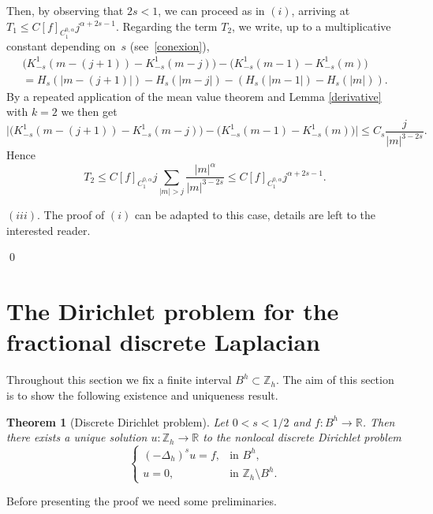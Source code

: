 \documentclass[a4paper,11pt,reqno]{amsart}
\newcommand{\R}{\mathbb{R}}
\newcommand{\Z}{\mathbb{Z}}
\newtheorem{thm}{Theorem}[section]
\theoremstyle{definition}
\numberwithin{equation}{section}
\begin{document}
Then, by observing that $2s <1$, we can proceed as in $(i)$,
arriving at $T_1\le C [ f]_{C_1^{0,\alpha}}j^{\alpha+2s-1}.$
Regarding the term $T_2$, we write, up to a multiplicative constant depending on~$s$ (see~\eqref{conexion}),
\begin{multline*}
\big(K^1_{-s}(m-(j+1))-K^1_{-s}(m-j)\big)-\big(K^1_{-s}(m-1)-K^1_{-s}(m)\big) \\
=H_s(|m-(j+1)|)-H_s(|m-j|) -(H_s(|m-1|)-H_s(|m|)).
\end{multline*}
By a repeated application of the mean value theorem and Lemma \ref{derivative} with $k=2$ we then get
$$
\big|\big(K^1_{-s}(m-(j+1))-K^1_{-s}(m-j)\big)-\big(K^1_{-s}(m-1)-K^1_{-s}(m)\big)\big|
\le C_s\frac{j}{|m|^{3-2s}}.
$$
Hence
$$
T_2\leq C[ f]_{C_1^{0,\alpha}}j\sum_{|m|>j}\frac{|m|^\alpha}{|m|^{3-2s}}
\le C[f]_{C_1^{0,\alpha}}j^{\alpha+2s-1}.
$$

\noindent $(iii).$ The proof of $(i)$ can be adapted to this case, details are left to the interested reader.

\qed

\section{The Dirichlet problem for the fractional discrete Laplacian}
\label{Section:Dirichlet}

Throughout this section we fix a finite interval $B^h\subset\Z_h$.
The aim of this section is to show the following existence and uniqueness result.

\begin{thm}[Discrete Dirichlet problem]\label{thm:discreteDirichletproblem}
Let $0<s<{1/2}$ and $f:B^h\to\R$.
Then there exists a unique solution $u:\Z_h\to\R$ to the nonlocal discrete Dirichlet problem
\begin{equation}
\label{laecuacion}
\begin{cases}
(-\Delta_h)^su=f, &\text{in } B^h, \\
u=0, &\text{in } \Z_h\setminus B^h.
\end{cases}
\end{equation}
\end{thm}

Before presenting the proof we need some preliminaries.
\end{document}
